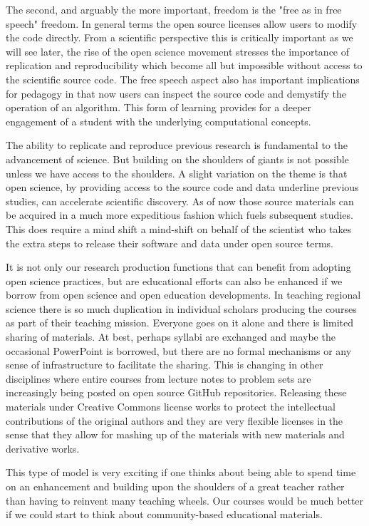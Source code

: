 \documentclass[11pt]{article}
\begin{document}
The second, and arguably the more important, freedom is the "free as in free
speech" freedom. In general terms the open source licenses allow users to
modify the code directly. From a scientific perspective this is critically
important as we will see later, the rise of the open science movement stresses
the importance of replication and reproducibility which become all but
impossible without access to the scientific source code. The free speech aspect
also has important implications for pedagogy in that now users can inspect the
source code and demystify the operation of an algorithm. This form of learning
provides for a deeper engagement of a student with the underlying computational
concepts.


The ability to replicate and reproduce previous research is fundamental to
the advancement of science. But building on the shoulders of giants is not
possible unless we have access to the shoulders. A slight variation on the
theme is that open science, by providing access to the source code and data
underline previous studies, can accelerate scientific discovery. As of now those
source materials can be acquired in a much more expeditious fashion which fuels
subsequent studies. This does require a mind shift a mind-shift on behalf of
the scientist who takes the extra steps to release their software
and data under open source terms.

It is not only our research production functions that can benefit from adopting
open science practices, but are educational efforts can also be enhanced if we
borrow from open science and open education developments. In teaching regional
science there is so much duplication in individual scholars producing the
courses as part of their teaching mission. Everyone goes on it alone and there
is limited sharing of materials. At best, perhaps syllabi are exchanged and
maybe the occasional PowerPoint is borrowed, but there are no formal mechanisms
or any sense of infrastructure to facilitate the sharing. This is changing in
other disciplines where entire courses from lecture notes to problem sets are
increasingly being posted on open source GitHub repositories. Releasing these
materials under Creative Commons license works to protect the intellectual
contributions of the original authors and they are very flexible licenses in
the sense that they allow for mashing up of the materials with new materials
and derivative works.

This type of model is very exciting if one thinks about being able to spend
time on an enhancement  and building upon the shoulders of a great teacher
rather than having to reinvent many teaching wheels. Our courses would be much
better if we could start to think about community-based educational
materials.
\end{document}
